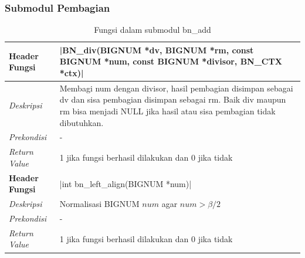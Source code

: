\subsubsection{Submodul Pembagian}
\begin{table}[h]
  \caption{Fungsi dalam submodul bn\_add}
  \begin{tabular}{R{2.5cm}L{10.5cm}}
    \toprule
    \textbf{Header Fungsi} & |BN_div(BIGNUM *dv, BIGNUM *rm, const BIGNUM *num, const BIGNUM *divisor, BN_CTX *ctx)|                                                                                                       \\ \midrule
    \textit{Deskripsi}     & Membagi num dengan divisor, hasil pembagian disimpan sebagai dv dan sisa pembagian disimpan sebagai rm. Baik div maupun rm bisa menjadi NULL jika hasil atau sisa pembagian tidak dibutuhkan. \\
    \textit{Prekondisi}    & -                                                                                                                                                                                             \\
    \textit{Return Value}  & 1 jika fungsi berhasil dilakukan dan 0 jika tidak
    \\ \bottomrule
    \textbf{Header Fungsi} & |int bn_left_align(BIGNUM *num)|                                                                                                                                                              \\ \midrule
    \textit{Deskripsi}     & Normalisasi BIGNUM $num$ agar $num > \beta/2$                                                                                                                                                 \\
    \textit{Prekondisi}    & -                                                                                                                                                                                             \\
    \textit{Return Value}  & 1 jika fungsi berhasil dilakukan dan 0 jika tidak
    \\ \bottomrule
  \end{tabular}

\end{table}

